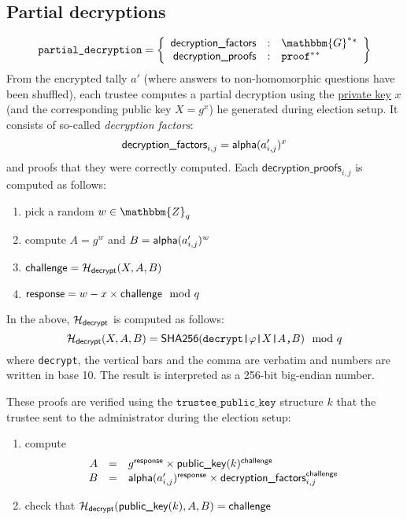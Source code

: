 \documentclass[a4paper]{article}
\newcommand{\G}{\mathbbm{G}}
\newcommand{\Z}{\mathbbm{Z}}
\newcommand{\shatwo}{\textsf{SHA256}}
\newcommand{\tpk}{\texttt{trustee\_public\_key}}
\newcommand{\pdecryption}{\texttt{partial\_decryption}}
\begin{document}
\subsection{Partial decryptions}

\newcommand{\dfactors}{\textsf{decryption\_factors}}
\newcommand{\dproofs}{\textsf{decryption\_proofs}}
\newcommand{\decrypt}{\textsf{decrypt}}

\begin{gather*}
  \pdecryption=\left\{
    \begin{array}{rcl}
      \dfactors&:&\G^\ast{}^\ast\\
      \dproofs&:&\proof^\ast{}^\ast
    \end{array}
  \right\}
\end{gather*}
From the encrypted tally $a'$ (where answers to non-homomorphic questions
have been shuffled), each trustee computes a partial decryption using
the \hyperref[trustee-keys]{private key} $x$ (and the corresponding
public key $X=g^x$) he generated during election setup. It consists of
so-called \emph{decryption factors}:
\[
\dfactors_{i,j}=\alphalabel(a'_{i,j})^x
\]
and proofs that they were correctly computed. Each $\dproofs_{i,j}$ is
computed as follows:
\begin{enumerate}
\item pick a random $w\in\Z_q$
\item compute $A=g^w$ and $B=\textsf{alpha}(a'_{i,j})^w$
\item $\challenge=\Hash_\decrypt(X,A,B)$
\item $\textsf{response}=w-x\times\textsf{challenge}\mod q$
\end{enumerate}
In the above, $\Hash_\decrypt$ is computed as follows:
\[
\Hash_\decrypt(X,A,B)=\shatwo(\verb=decrypt|=\varphi\verb=|=X\verb=|=A\verb=,=B)\mod q
\]
where \verb=decrypt=, the vertical bars and the comma are verbatim and
numbers are written in base 10. The result is interpreted as a 256-bit
big-endian number.

These proofs are verified using the $\tpk$ structure $k$ that the
trustee sent to the administrator during the election setup:
\begin{enumerate}
\item compute
\[
\begin{array}{rcl}
A&=&{g^\response}\times{\pklabel(k)^\challenge}\\
B&=&{\alphalabel(a'_{i,j})^\response}\times{\dfactors_{i,j}^\challenge}
\end{array}
\]
\item check that $\Hash_\decrypt(\pklabel(k),A,B)=\challenge$
\end{enumerate}
\end{document}

